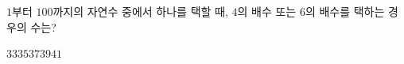 \hspace*{2mm}\begin{minipage}[t]{\dimexpr\linewidth-2mm\relax}\vspace{0pt}
$1$부터 $100$까지의 자연수 중에서 하나를 택할 때, $4$의 배수 또는 $6$의 배수를 택하는 경우의 수는?
\begin{choices32}{$33$}{$35$}{$37$}{$39$}{$41$}\end{choices32}\end{minipage}
